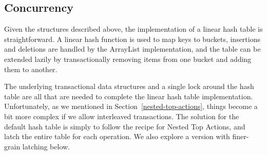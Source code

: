 \documentclass[10pt,letterpaper,twocolumn,english]{article}
\newcommand{\yad}{LLADD\xspace}
\begin{document}
\subsection{Concurrency}

Given the structures described above, the implementation of a linear
hash table is straightforward.  A linear hash function is used to map
keys to buckets, insertions and deletions are handled by the ArrayList
implementation, and the table can be extended lazily by
transactionally removing items from one bucket and adding them to
another.  

The underlying transactional data structures and a
single lock around the hash table are all that are needed
to complete the linear hash table implementation.  Unfortunately, as
we mentioned in Section~\ref{nested-top-actions}, things become a bit
more complex if we allow interleaved transactions.  The solution for
the default hash table is simply to follow the recipe for Nested
Top Actions, and latch the entire table for each operation.
We also explore a version with finer-grain latching below.
\end{document}
